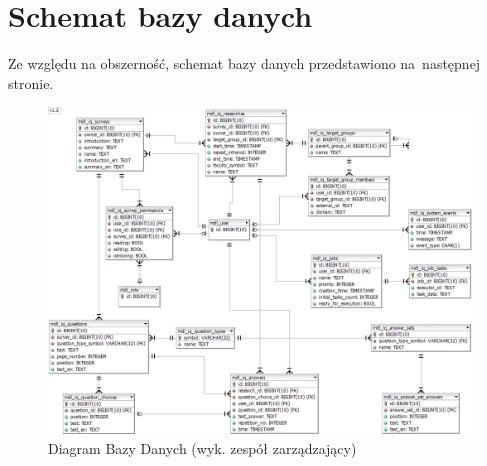 \section{Schemat bazy danych}
\label{Chapter56}

Ze względu na obszerność, schemat bazy danych przedstawiono na~następnej stronie.

\newpage
\begin{landscape}
\begin{figure}[th]
\centering\includegraphics[height=\textheight, width=1.5\textwidth]{figures/iQuest_Database}
\caption{Diagram Bazy Danych (wyk. zespół zarządzający)}\label{rys:iQuest_DataBase}
\end{figure}
\end{landscape}